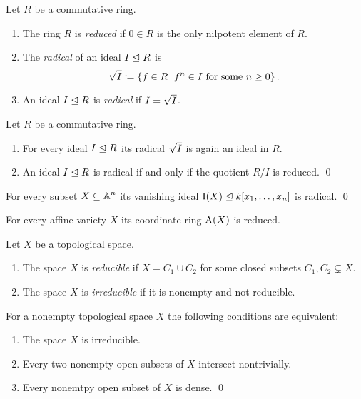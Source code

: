 \begin{definition}
  Let $R$ be a commutative ring.
  \begin{enumerate}
    \item
      The ring $R$ is \emph{reduced} if $0 \in R$ is the only nilpotent element of $R$.
    \item
      The \emph{radical} of an ideal $I \trianglelefteq R$ is
      \[
                  \rad{I}
        \defined  \{
                    f \in R
                  \suchthat
                    \text{$f^n \in I$ for some $n \geq 0$}
                  \} \,.
      \]
    \item
      An ideal $I \trianglelefteq R$ is \emph{radical} if $I = \sqrt{I}$.
  \end{enumerate}
\end{definition}


\begin{lemma}
  Let $R$ be a commutative ring.
  \begin{enumerate}
    \item
      For every ideal $I \trianglelefteq R$ its radical $\sqrt{I}$ is again an ideal in $R$.
    \item
      An ideal $I \trianglelefteq R$ is radical if and only if the quotient $R/I$ is reduced.
    \qed
  \end{enumerate}
\end{lemma}


\begin{lemma}
  For every subset $X \subseteq \operatorname{\mathbb{A}}^n$ its vanishing ideal $\operatorname{I}(X) \trianglelefteq k[x_1, \dotsc, x_n]$ is radical.
  \qed
\end{lemma}


\begin{corollary}
  For every affine variety $X$ its coordinate ring $\operatorname{A}(X)$ is reduced.
\end{corollary}


\begin{definition}
  Let $X$ be a topological space.
  \begin{enumerate}
    \item
      The space $X$ is \emph{reducible} if $X = C_1 \cup C_2$ for some closed subsets $C_1, C_2 \subsetneq X$.
    \item
      The space $X$ is \emph{irreducible} if it is nonempty and not reducible.
  \end{enumerate}
\end{definition}


\begin{lemma}
  For a nonempty topological space $X$ the following conditions are equivalent:
  \begin{enumerate}
    \item
      The space $X$ is irreducible.
    \item
      Every two nonempty open subsets of $X$ intersect nontrivially.
    \item
      Every nonemtpy open subset of $X$ is dense.
    \qed
  \end{enumerate}
\end{lemma}


